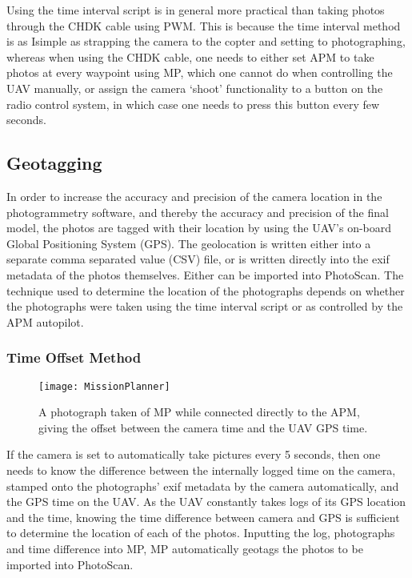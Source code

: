 Using the time interval script is in general more practical than taking photos
through the CHDK cable using PWM. This is because the time interval method is as
Isimple as strapping the camera to the copter and setting to photographing,
whereas when using the CHDK cable, one needs to either set APM to take photos at
every waypoint using MP, which one cannot do when controlling the UAV manually,
or assign the camera `shoot' functionality to a button on the radio control
system, in which case one needs to press this button every few seconds.

\subsection{Geotagging}
\label{sec:methods/geotagging}

In order to increase the accuracy and precision of the camera location in the
photogrammetry software, and thereby the accuracy and precision of the final
model, the photos are tagged with their location by using the UAV's on-board
Global Positioning System (GPS). The geolocation is written either into a
separate comma separated value (CSV) file, or is written directly into the exif
metadata of the photos themselves. Either can be imported into PhotoScan. The
technique used to determine the location of the photographs depends on whether
the photographs were taken using the time interval script or as controlled by
the APM autopilot.

\subsubsection{Time Offset Method}

\begin{wrapfigure}{r}{0.5\textwidth}
    \centering
    \texttt{[image: MissionPlanner]}
    \caption{A photograph taken of MP while connected directly to the APM,
        giving the offset between the camera time and the UAV GPS time.}
    \label{img:mission-planner}
\end{wrapfigure}

If the camera is set to automatically take pictures every 5 seconds, then one
needs to know the difference between the internally logged time on the camera,
stamped onto the photographs' exif metadata by the camera automatically, and the
GPS time on the UAV. As the UAV constantly takes logs of its GPS location and
the time, knowing the time difference between camera and GPS is sufficient to
determine the location of each of the photos. Inputting the log, photographs and
time difference into MP, MP automatically geotags the photos to be imported into
PhotoScan.

